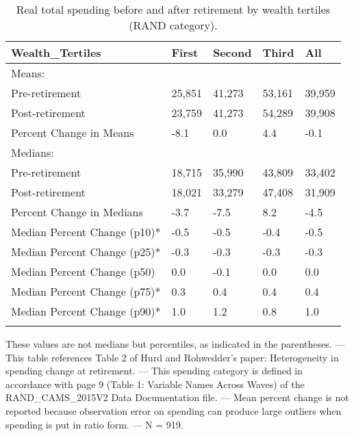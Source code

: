 \begin{table}[tbp] \centering
{}

\caption{Real total spending before and after retirement by wealth tertiles (RAND category).}
\begin{tabularx}{\textwidth}{lCCCC}

\toprule
{Wealth\_Tertiles}&{First}&{Second}&{Third}&{All} \tabularnewline
\midrule\addlinespace[1.5ex]
Means:&&&& \tabularnewline
\midrule Pre-retirement&25,851&41,273&53,161&39,959 \tabularnewline
Post-retirement&23,759&41,273&54,289&39,908 \tabularnewline
Percent Change in Means&-8.1&0.0&4.4&-0.1 \tabularnewline
\midrule Medians:&&&& \tabularnewline
\midrule Pre-retirement&18,715&35,990&43,809&33,402 \tabularnewline
Post-retirement&18,021&33,279&47,408&31,909 \tabularnewline
Percent Change in Medians&-3.7&-7.5&8.2&-4.5 \tabularnewline
Median Percent Change (p10)*&-0.5&-0.5&-0.4&-0.5 \tabularnewline
Median Percent Change (p25)*&-0.3&-0.3&-0.3&-0.3 \tabularnewline
Median Percent Change (p50)&0.0&-0.1&0.0&0.0 \tabularnewline
Median Percent Change (p75)*&0.3&0.4&0.4&0.4 \tabularnewline
Median Percent Change (p90)*&1.0&1.2&0.8&1.0 \tabularnewline
\bottomrule \addlinespace[1.5ex]

\end{tabularx}
\begin{flushleft}
\footnotesize *These values are not medians but percentiles, as indicated in the parentheses. \linebreak --- \linebreak This table references Table 2 of Hurd and Rohwedder's paper: Heterogeneity in spending change at retirement. \linebreak --- \linebreak This spending category is defined in accordance with page 9 (Table 1: Variable Names Across Waves) of the RAND\_CAMS\_2015V2 Data Documentation file. \linebreak --- \linebreak Mean percent change is not reported because observation error on spending can produce large outliers when spending is put in ratio form. \linebreak --- \linebreak N = 919.
\end{flushleft}
\end{table}
